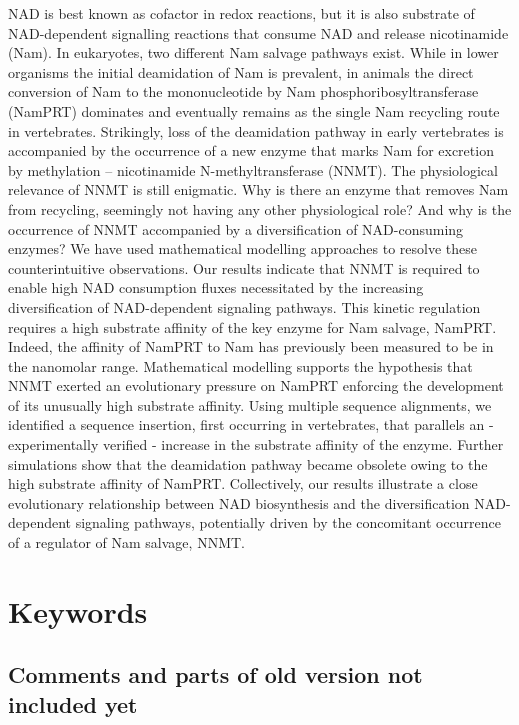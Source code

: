 \documentclass[paper=a4, 12pt]{scrartcl}
\begin{document}
NAD is best known as cofactor in redox reactions, but it is also substrate of NAD-dependent signalling reactions that consume NAD and release nicotinamide (Nam). In eukaryotes, two different Nam salvage pathways exist. While in lower organisms the initial deamidation of Nam is prevalent, in animals the direct conversion of Nam to the mononucleotide by Nam phosphoribosyltransferase (NamPRT) dominates and eventually remains as the single Nam recycling route in vertebrates.
Strikingly, loss of the deamidation pathway in early vertebrates is accompanied by the occurrence of a new enzyme that marks Nam for excretion by methylation – nicotinamide N-methyltransferase (NNMT). The physiological relevance of NNMT is still enigmatic. Why is there an enzyme that removes Nam from recycling, seemingly not having any other physiological role? And why is the occurrence of NNMT accompanied by a diversification of NAD-consuming enzymes?
We have used mathematical modelling approaches to resolve these counterintuitive observations. Our results indicate that NNMT is required to enable high NAD consumption fluxes necessitated by the increasing diversification of NAD-dependent signaling pathways. This kinetic regulation requires a high substrate affinity of the key enzyme for Nam salvage, NamPRT. Indeed, the affinity of NamPRT to Nam has previously been measured to be in the nanomolar range. Mathematical modelling supports the hypothesis that NNMT exerted an evolutionary pressure on NamPRT enforcing the development of its unusually high substrate affinity. Using multiple sequence alignments, we identified a sequence insertion, first occurring in vertebrates, that parallels an - experimentally verified - increase in the substrate affinity of the enzyme. Further simulations show that the deamidation pathway became obsolete owing to the high substrate affinity of NamPRT. Collectively, our results illustrate a close evolutionary relationship between NAD biosynthesis and the diversification NAD-dependent signaling pathways, potentially driven by the concomitant occurrence of a regulator of Nam salvage, NNMT.

\section{Keywords}






\subsection{Comments and parts of old version not included yet}
\end{document}
